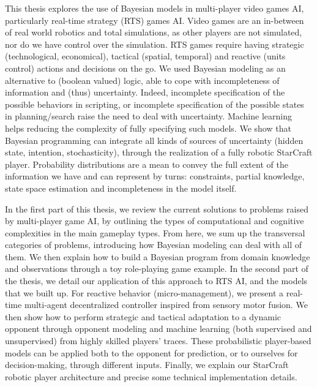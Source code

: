 This thesis explores the use of Bayesian models in multi-player video games AI, particularly real-time strategy (RTS) games AI. Video games are an in-between of real world robotics and total simulations, as other players are not simulated, nor do we have control over the simulation. RTS games require having strategic (technological, economical), tactical (spatial, temporal) and reactive (units control) actions and decisions on the go. %
We used Bayesian modeling as an alternative to (boolean valued) logic, able to cope with incompleteness of information and (thus) uncertainty. %
Indeed, incomplete specification of the possible behaviors in scripting, or incomplete specification of the possible states in planning/search raise the need to deal with uncertainty. Machine learning helps reducing the complexity of fully specifying such models. 
We show that Bayesian programming can integrate all kinds of sources of uncertainty (hidden state, intention, stochasticity), through the realization of a fully robotic StarCraft player. Probability distributions are a mean to convey the full extent of the information we have %
and can represent by turns: constraints, partial knowledge, state space estimation and incompleteness in the model itself.

In the first part of this thesis, we review the current solutions to problems raised by multi-player game AI, by outlining the types of computational and cognitive complexities in the main gameplay types. From here, we sum up the transversal categories of problems, introducing how Bayesian modeling can deal with all of them. We then explain how to build a Bayesian program from domain knowledge and observations through a toy role-playing game example. In the second part of the thesis, we detail our application of this approach to RTS AI, and the models that we built up. For reactive behavior (micro-management), we present a real-time multi-agent decentralized controller inspired from sensory motor fusion. We then show how to perform strategic and tactical adaptation to a dynamic opponent through opponent modeling and machine learning (both supervised and unsupervised) from highly skilled players' traces. These probabilistic player-based models can be applied both to the opponent for prediction, or to ourselves for decision-making, through different inputs. Finally, we explain our StarCraft robotic player architecture and precise some technical implementation details.

